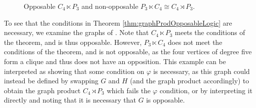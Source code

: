 \documentclass[11pt]{article}
\theoremstyle{definition}
\begin{document}
\begin{figure}
    \centering
    \caption{Opposable $C_4\ltimes P_3$ and non-opposable $P_3\ltimes C_4 \cong
    C_4\rtimes P_3$.}
    \label{fig:graph_product_opposability}
\end{figure}

To see that the conditions in Theorem \ref{thm:graphProdOpposableLogic}  are
necessary, we examine the graphs of . Note
that $C_4\ltimes P_3$ meets the conditions of the theorem, and is thus
opposable. However, $P_3\ltimes C_4$ does not meet the conditions of the
theorem, and is not opposable, as the four vertices of degree five form a
clique and thus does not have an opposition. This example can be interpreted as
showing that some condition on $\varphi$ is necessary, as this graph could
instead be defined by swapping $G$ and $H$ (and the graph product accordingly)
to obtain the graph product $C_4\rtimes P_3$ which fails the $\varphi$
condition, or by interpreting it directly and noting  that it is necessary that
$G$ is opposable.
\end{document}
